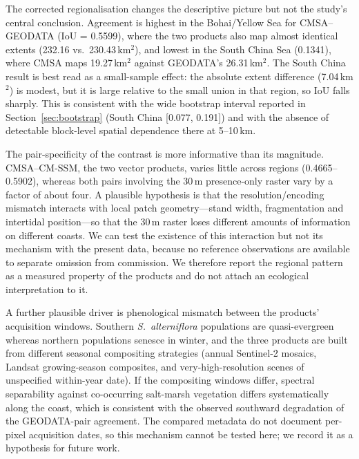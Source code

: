 \documentclass[11pt]{article}
\begin{document}
The corrected regionalisation changes the descriptive picture but not the
study's central conclusion. Agreement is highest in the Bohai/Yellow Sea for
CMSA--GEODATA (IoU = 0.5599), where the two products also map almost identical
extents (232.16 vs.\ 230.43\,km$^2$), and lowest in the South China Sea
(0.1341), where CMSA maps 19.27\,km$^2$ against GEODATA's 26.31\,km$^2$. The
South China result is best read as a small-sample effect: the absolute extent
difference (7.04\,km$^2$) is modest, but it is large relative to the small
union in that region, so IoU falls sharply. This is consistent with the wide
bootstrap interval reported in Section~\ref{sec:bootstrap} (South China
[0.077, 0.191]) and with the absence of detectable block-level spatial
dependence there at 5--10\,km.

The pair-specificity of the contrast is more informative than its magnitude.
CMSA--CM-SSM, the two vector products, varies little across regions
(0.4665--0.5902), whereas both pairs involving the 30\,m presence-only raster
vary by a factor of about four. A plausible hypothesis is that the
resolution/encoding mismatch interacts with local patch geometry---stand width,
fragmentation and intertidal position---so that the 30\,m raster loses
different amounts of information on different coasts. We can test the
existence of this interaction but not its mechanism with the present data,
because no reference observations are available to separate omission from
commission. We therefore report the regional pattern as a measured property of
the products and do not attach an ecological interpretation to it.

A further plausible driver is phenological mismatch between the products'
acquisition windows. Southern \textit{S.~alterniflora} populations are
quasi-evergreen whereas northern populations senesce in winter, and the three
products are built from different seasonal compositing strategies (annual
Sentinel-2 mosaics, Landsat growing-season composites, and very-high-resolution
scenes of unspecified within-year date). If the compositing windows differ,
spectral separability against co-occurring salt-marsh vegetation differs
systematically along the coast, which is consistent with the observed
southward degradation of the GEODATA-pair agreement. The compared metadata do
not document per-pixel acquisition dates, so this mechanism cannot be tested
here; we record it as a hypothesis for future work.
\end{document}
